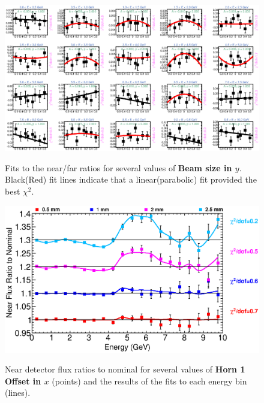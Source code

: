 {\begin{figure}[ht]
  \begin{center}
    {\includegraphics[width=5.0in]{figures/BeamSigmaY_nof_fits.eps}}
  \end{center}
\caption{ Fits to the near/far ratios for several values of {\bf Beam size in $y$}. Black(Red) fit lines indicate that a linear(parabolic) fit provided the best $\chi^2$. }
\end{figure}

\clearpage

\begin{figure}[ht]
  \begin{center}
    {\includegraphics[width=6.0in]{figures/Horn1XOffset_near_summary.eps}}
  \end{center}
\caption{ Near detector flux ratios to nominal for several values of {\bf Horn 1 Offset in $x$} (points) and the results of the fits to each energy bin (lines).}
\end{figure}

}
